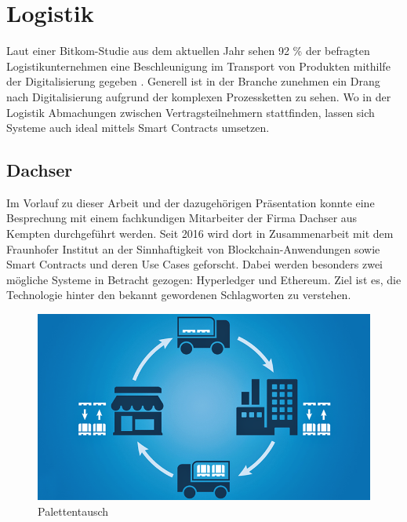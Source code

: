 \chapter{Logistik}
\label{chap:Logistik}

Laut einer Bitkom-Studie aus dem aktuellen Jahr sehen 92 \% der befragten Logistikunternehmen eine Beschleunigung im Transport von Produkten mithilfe der Digitalisierung gegeben \cite{Bitkom2019}. Generell ist in der Branche zunehmen ein Drang nach Digitalisierung aufgrund der komplexen Prozessketten zu sehen. Wo in der Logistik Abmachungen zwischen Vertragsteilnehmern stattfinden, lassen sich Systeme auch ideal mittels Smart Contracts umsetzen. 

\section{Dachser}
Im Vorlauf zu dieser Arbeit und der dazugehörigen Präsentation konnte eine Besprechung mit einem fachkundigen Mitarbeiter der Firma Dachser aus Kempten durchgeführt werden. Seit 2016 wird dort in Zusammenarbeit mit dem Fraunhofer Institut an der Sinnhaftigkeit von Blockchain-Anwendungen sowie Smart Contracts und deren Use Cases geforscht. Dabei werden besonders zwei mögliche Systeme in Betracht gezogen: Hyperledger und Ethereum. Ziel ist es, die Technologie hinter den bekannt gewordenen Schlagworten zu verstehen.

\begin{figure}[h!]
  \centering
  \includegraphics[width=\textwidth]{Bilder/Palettentausch.png}
  \caption[Palettentausch]{Palettentausch \cite{Disponaut2016}}
  \label{fig:palettentausch}
\end{figure}

